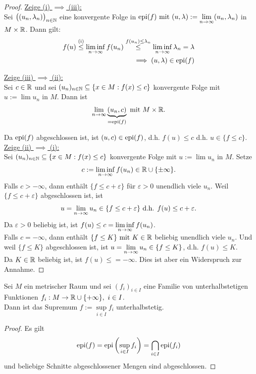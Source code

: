 \begin{proof}
\underline{Zeige (i) $\implies$ (iii):}\\
Sei $\big((u_n,\lambda_n)\big)_{n\in\mathbb{N}}$ eine konvergente Folge in $\text{epi}(f)\text{ mit }(u,\lambda):=\lim\limits_{n\to\infty}(u_n,\lambda_n)$ in $M\times\mathbb{R}$. Dann gilt:
\begin{align*}
f(u)
\stackrel{\text{(i)}}{\leq}
\liminf\limits_{n\to\infty} f(u_n)
\stackrel{f(u_n)\leq\lambda_n}{\leq}
\liminf\limits_{n\to\infty} \lambda_n
=\lambda\\
\implies
(u,\lambda)\in\text{epi}(f)
\end{align*}

\underline{Zeige (iii) $\implies$ (ii):}\\
Sei $c\in\mathbb{R}$ und sei $(u_n)_{n\in\mathbb{N}}\subseteq\lbrace x\in M:f(x)\leq c\rbrace$ konvergente Folge mit $u:=\lim u_n$ in $M$. 
Dann ist
\begin{align*}
	\lim\limits_{n\to\infty}\underbrace{(u_n,c)}_{=\text{epi}(f)}\text{ mit } M\times\mathbb{R}.
\end{align*}

Da $\text{epi}(f)$ abgeschlossen ist, ist $(u,c)\in\text{epi}(f)$, d.h. $f(u)\leq c$ d.h. $u\in\lbrace f\leq c\rbrace$.\nl
\underline{Zeige (ii) $\implies$ (i):}\\
Sei $(u_n)_{n\in\mathbb{N}}\subseteq\lbrace x\in M:f(x)\leq c\rbrace$ konvergente Folge mit $u:=\lim u_n$ in $M$. Setze
\begin{align*}
c:=\liminf\limits_{n\to\infty} f(u_n)\in\mathbb{R}\cup\lbrace\pm\infty\rbrace.
\end{align*}
Falls $c>-\infty$, dann enthält $\lbrace f\leq c+\varepsilon\rbrace$ für $\varepsilon>0$ unendlich viele $u_n$. Weil $\lbrace f\leq c+\varepsilon\rbrace$ abgeschlossen ist, ist
\begin{align*}
u=\lim\limits_{n\to\infty} u_n\in\lbrace f\leq c+\varepsilon\rbrace\text{ d.h. } f(u)\leq c+\varepsilon.
\end{align*}
Da $\varepsilon>0$ beliebig ist, ist $f(u)\leq c=\liminf\limits\limits_{n\to\infty} f(u_n)$.\\
Falls $c=-\infty$, dann enthält $\lbrace f\leq K\rbrace\text{ mit } K\in\mathbb{R}$ beliebig unendlich viele $u_n$. Und weil $\lbrace f\leq K\rbrace$ abgeschlossen ist, ist $u=\lim\limits_{n\to\infty} u_n\in\lbrace f\leq K\rbrace$, d.h. $f(u)\leq K$.\\
Da $K\in\mathbb{R}$ beliebig ist, ist $f(u)\leq=-\infty$. Dies ist aber ein Widerspruch zur Annahme.
\end{proof}

\begin{lemma}
Sei $M$ ein metrischer Raum und sei $(f_i)_{i\in I}$ eine Familie von unterhalbstetigen Funktionen $f_i:M\to\mathbb{R}\cup\lbrace+\infty\rbrace,~i\in I$.\\
Dann ist das Supremum $f:=\sup\limits_{i\in I} f_i$ unterhalbstetig.
\end{lemma}
\begin{proof}
Es gilt
\begin{align*}
\text{epi}(f)=\text{epi}\left(\sup\limits_{i\in I} f_i\right)=\bigcap\limits_{i\in I}\text{epi}(f_i)
\end{align*}
und beliebige Schnitte abgeschlossener Mengen sind abgeschlossen.
\end{proof}

